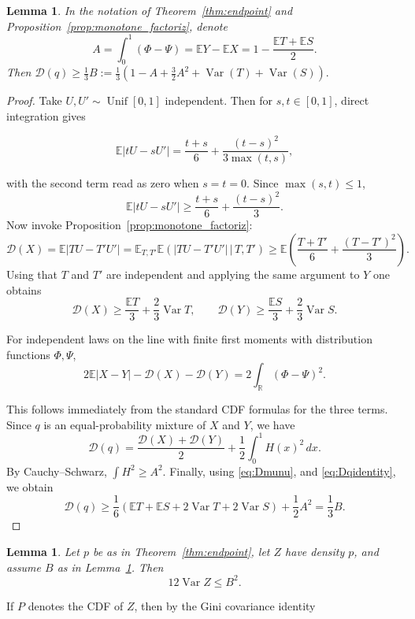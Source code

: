 \documentclass[final,12pt]{elsarticle}
\numberwithin{equation}{section}
\newtheorem{lem}[thm]{Lemma}
\theoremstyle{remark}
\newcommand{\R}{\mathbb R}
\newcommand{\E}{\mathbb E}
\newcommand{\Var}{\operatorname{Var}}
\newcommand{\Unif}{\operatorname{Unif}}
\newcommand{\Gini}{\mathcal D}
\theoremstyle{definition}
\begin{document}
\begin{lem}\label{lem:low_bound_enpdpoint}
    In the notation of Theorem~\ref{thm:endpoint} and Proposition~\ref{prop:monotone_factoriz}, denote 
    $$ A=\int_0^1(\Phi-\Psi)
   =\E Y-\E X
   =1-\frac{\E T+\E S}{2}.$$
   Then $\Gini(q) \geq \frac{1}{3} B := \frac{1}{3}(1-A+\frac{3}{2}A^2 + \Var(T) + \Var(S)).$
\end{lem}
\begin{proof}
    

Take $U, U'\sim \Unif[0,1]$ independent. Then for $s,t\in[0,1]$, direct integration gives

$$ \E|tU-sU'|
 =\frac{t+s}{6}
 +\frac{(t-s)^2}{3\max(t,s)},$$

with the second term read as zero when $s=t=0$. Since $\max(s,t)\le1$,
$$
 \E|tU-sU'|
 \ge \frac{t+s}{6}+\frac{(t-s)^2}{3}.
$$
Now  invoke Proposition~\ref{prop:monotone_factoriz}:
$$\Gini(X) = \E|TU-T'U'| = \E_{T,T'}\E(|TU-T'U'| \, |\,T, T') \geq \E(\frac{T+T'}{6}+\frac{(T-T')^2}{3}).$$
Using that $T$ and $T'$ are independent and applying the same argument to $Y$ one obtains
\begin{equation}\label{eq:Dmunu}
 \Gini(X)\ge\frac{\E T}{3}+\frac23\Var T,
 \qquad
 \Gini(Y)\ge\frac{\E S}{3}+\frac23\Var S.
\end{equation}

For independent laws on the line with finite first moments with distribution functions $\Phi,\Psi$,
$$ 2\E|X-Y|-\Gini(X)-\Gini(Y)
 =2\int_{\R}(\Phi-\Psi)^2.$$

This follows immediately from the standard CDF formulas for the three terms. Since $q$ is an equal-probability mixture of $X$ and $Y$, we have 
\begin{equation}\label{eq:Dqidentity}
 \Gini(q)
 =\frac{\Gini(X)+\Gini(Y)}2
  +\frac12\int_0^1H(x)^2\,dx.
\end{equation}
By Cauchy--Schwarz, $\int H^2\ge A^2$. Finally, using \eqref{eq:Dmunu}, and \eqref{eq:Dqidentity}, we obtain
\begin{equation}\label{eq:Dqlower}
 \Gini(q)\ge\frac{1}{6} (\E T + \E S + 2 \Var T + 2 \Var S) + \frac{1}{2}A^2 = \frac{1}{3}B.
\end{equation}
\end{proof}


\begin{lem} \label{lem:upper_bound} Let $p$ be as in Theorem~\ref{thm:endpoint}, let $Z$ have density $p$, and assume $B$ as in Lemma~\ref{lem:low_bound_enpdpoint}. Then
$$ 12\Var Z\le B^2.$$

\end{lem}
If $P$ denotes the CDF of $Z$, then  by the Gini covariance identity
\end{document}

